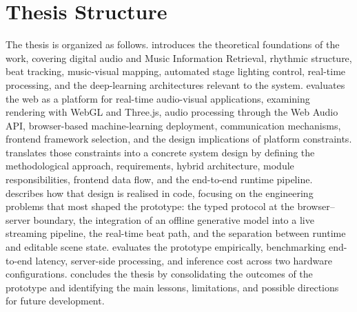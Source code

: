 \section{Thesis Structure}

The thesis is organized as follows.  introduces the theoretical foundations of the work, covering digital audio and Music Information Retrieval, rhythmic structure, beat tracking, music-visual mapping, automated stage lighting control, real-time processing, and the deep-learning architectures relevant to the system.  evaluates the web as a platform for real-time audio-visual applications, examining rendering with WebGL and Three.js, audio processing through the Web Audio API, browser-based machine-learning deployment, communication mechanisms, frontend framework selection, and the design implications of platform constraints.  translates those constraints into a concrete system design by defining the methodological approach, requirements, hybrid architecture, module responsibilities, frontend data flow, and the end-to-end runtime pipeline.  describes how that design is realised in code, focusing on the engineering problems that most shaped the prototype: the typed protocol at the browser--server boundary, the integration of an offline generative model into a live streaming pipeline, the real-time beat path, and the separation between runtime and editable scene state.  evaluates the prototype empirically, benchmarking end-to-end latency, server-side processing, and inference cost across two hardware configurations.  concludes the thesis by consolidating the outcomes of the prototype and identifying the main lessons, limitations, and possible directions for future development.
